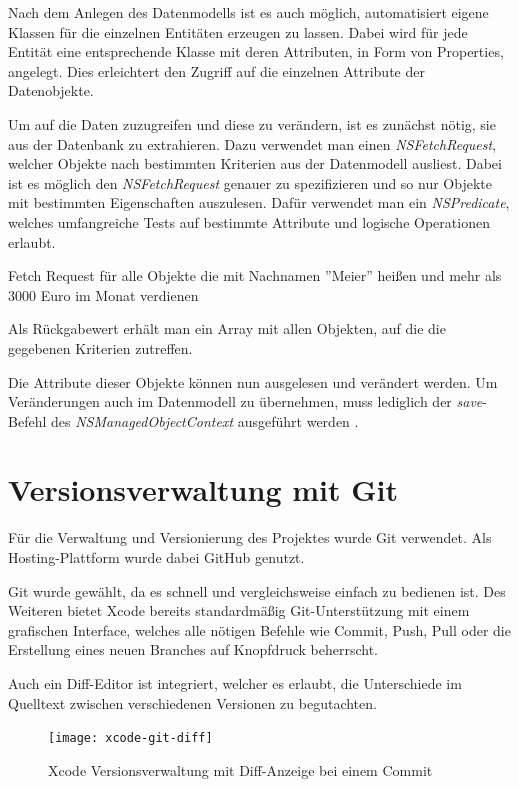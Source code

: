 Nach dem Anlegen des Datenmodells ist es auch möglich, automatisiert eigene Klassen für die einzelnen Entitäten erzeugen zu lassen. Dabei wird für jede Entität eine entsprechende Klasse mit deren Attributen, in Form von Properties, angelegt. Dies erleichtert den Zugriff auf die einzelnen Attribute der Datenobjekte.

Um auf die Daten zuzugreifen und diese zu verändern, ist es zunächst nötig, sie aus der Datenbank zu extrahieren. Dazu verwendet man einen \emph{NSFetchRequest}, welcher Objekte nach bestimmten Kriterien aus der Datenmodell ausliest.
Dabei ist es möglich den \emph{NSFetchRequest} genauer zu spezifizieren und so nur Objekte mit bestimmten Eigenschaften auszulesen.
Dafür verwendet man ein \emph{NSPredicate}, welches umfangreiche Tests auf bestimmte Attribute und logische Operationen erlaubt.

\begin{listing}[htb! breaklines=true]
    \caption{Fetch Request für alle Objekte die mit Nachnamen ''Meier'' heißen und mehr als 3000 Euro im Monat verdienen}
	\label{lst:NSFetchRequest_objc}
\end{listing}

Als Rückgabewert erhält man ein Array mit allen Objekten, auf die die gegebenen Kriterien zutreffen.

Die Attribute dieser Objekte können nun ausgelesen und verändert werden. Um Veränderungen auch im Datenmodell zu übernehmen, muss lediglich der \emph{save}-Befehl des \emph{NSManagedObjectContext} ausgeführt werden \cite{coredataguide}.

\section{Versionsverwaltung mit Git}
\label{sec:tools:git}
Für die Verwaltung und Versionierung des Projektes wurde Git verwendet. Als Hosting-Plattform wurde dabei GitHub \cite{github} genutzt.

Git wurde gewählt, da es schnell und vergleichsweise einfach zu bedienen ist. Des Weiteren bietet Xcode bereits standardmäßig Git-Unterstützung mit einem grafischen Interface, welches alle nötigen Befehle wie Commit, Push, Pull oder die Erstellung eines neuen Branches auf Knopfdruck beherrscht.

Auch ein Diff-Editor ist integriert, welcher es erlaubt, die Unterschiede im Quelltext zwischen verschiedenen Versionen zu begutachten.

\begin{figure}[htb!]
		  \centering
	\texttt{[image: xcode-git-diff]}
	\caption{Xcode Versionsverwaltung mit Diff-Anzeige bei einem Commit}
	\label{xcode-git-diff}
\end{figure}


